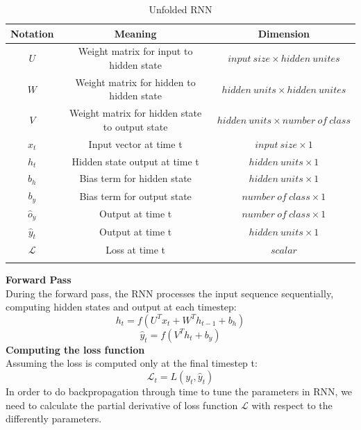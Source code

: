 \documentclass[12pt,a4paper]{article}
\begin{document}
\newpage
\begin{longtable}{|c|c|c|}
    \hline
    \textbf{Notation} & \textbf{Meaning} & \textbf{Dimension}\\
    \hline
    $U$          & Weight matrix for input to hidden state       & $input\ size\times hidden\ unites$\\
    $W$          & Weight matrix for hidden to hidden state      & $hidden\ units\times hidden\ unites$\\
    $V$          & Weight matrix for hidden state to output state& $hidden\ units\times number\ of\ class$\\
    $x_t$        & Input vector at time t                        & $input\ size\times 1$\\
    $h_t$        & Hidden state output at time t                 & $hidden\ units\times 1$\\
    $b_h$        & Bias term for hidden state                    & $hidden\ units\times 1$\\
    $b_y$        & Bias term for output state                    & $number\ of\ class\times 1$\\
    $\hat{o}_y$  & Output at time t                              & $number\ of\ class\times 1$\\
    $\hat{y}_t$  & Output at time t                              & $hidden\ units\times 1$\\
    $\mathcal{L}$& Loss at time t                                & $scalar$\\
    \hline
    \caption{Unfolded RNN}
\end{longtable}
\noindent \textbf{Forward Pass}
\\[1ex]
During the forward pass, the RNN processes the input sequence sequentially, computing hidden states and output at each timestep:
\begin{equation}
    h_t = f(U^Tx_{t}+W^Th_{t-1}+b_h)
\end{equation}
\begin{equation}
    \hat{y}_t = f(V^Th_t+b_y)
\end{equation}
\newline  %
\noindent \textbf{Computing the loss function}
\\[1ex]
Assuming the loss is computed only at the final timestep t:
\begin{equation}
    \mathcal{L}_t = L(y_t, \hat{y}_t)
\end{equation}
In order to do backpropagation through time to tune the parameters in RNN, we need to calculate the partial derivative of loss function $\mathcal{L}$ with respect to the differently parameters.\\
\end{document}

